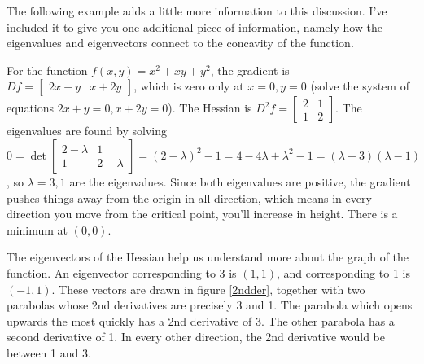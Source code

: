 The following example adds a little more information to this discussion. I've included it to give you one additional piece of information, namely how the eigenvalues and eigenvectors connect to the concavity of the function. 

\begin{example}
For the function {$f(x,y)=x^2+xy+y^2$}, the gradient is $Df = \begin{bmatrix}2x+y&x+2y \end{bmatrix}$, which is zero only at $x=0,y=0$ (solve the system of equations $2x+y=0,x+2y=0$). The Hessian is $D^2f = \begin{bmatrix}2&1 \\1&2\end{bmatrix}$. The eigenvalues are found by solving $0=\det \begin{bmatrix}2-\lambda &1 \\1&2-\lambda \end{bmatrix} = (2-\lambda)^2-1 = 4-4\lambda+\lambda^2 -1 = (\lambda-3)(\lambda-1)$, so $\lambda = 3,1$ are the eigenvalues.  Since both eigenvalues are positive, the gradient pushes things away from the origin in all direction, which means in every direction you move from the critical point, you'll increase in height.  There is a minimum at $(0,0)$.  

The eigenvectors of the Hessian help us understand more about the graph of the function.  An eigenvector corresponding to 3 is $(1,1)$, and corresponding to 1 is $(-1,1)$. These vectors are drawn in figure \ref{2ndder}, together with two parabolas whose 2nd derivatives are precisely 3 and 1.  The parabola which opens upwards the most quickly has a 2nd derivative of 3.  The other parabola has a second derivative of 1. In every other direction, the 2nd derivative would be between 1 and 3.
\end{example}

